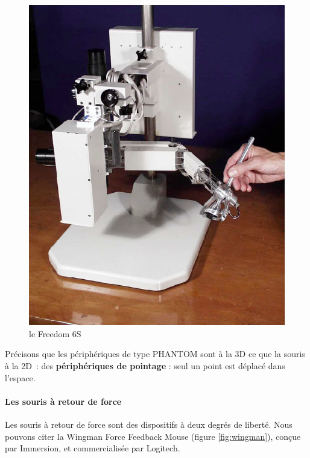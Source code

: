 \documentclass[
]{book}
\begin{document}
\begin{figure}
\centering
\includegraphics{img/freedom6s.png}
\caption{\label{fig:freedom6s}le Freedom 6S}
\end{figure}

Précisons que les périphériques de type PHANTOM sont à la 3D ce que la
souris à la 2D~: des \textbf{périphériques de pointage} : seul un point est
déplacé dans l'espace.

\hypertarget{les-souris-uxe0-retour-de-force}{%
\paragraph{Les souris à retour de force}\label{les-souris-uxe0-retour-de-force}}

Les souris à retour de force sont des dispositifs à deux degrés de
liberté. Nous pouvons citer la Wingman Force Feedback Mouse
(figure \ref{fig:wingman}), conçue par Immersion, et
commercialisée par Logitech.
\end{document}
